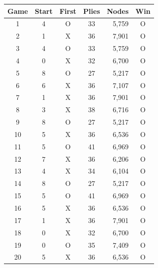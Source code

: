 \begin{tabular}{ccccrc}
\toprule
Game & Start & First & Plies & Nodes & Win \\
\midrule
1 & 4 & O & 33 & 5,759 & O \\
2 & 1 & X & 36 & 7,901 & O \\
3 & 4 & O & 33 & 5,759 & O \\
4 & 0 & X & 32 & 6,700 & O \\
5 & 8 & O & 27 & 5,217 & O \\
6 & 6 & X & 36 & 7,107 & O \\
7 & 1 & X & 36 & 7,901 & O \\
8 & 3 & X & 38 & 6,716 & O \\
9 & 8 & O & 27 & 5,217 & O \\
10 & 5 & X & 36 & 6,536 & O \\
11 & 5 & O & 41 & 6,969 & O \\
12 & 7 & X & 36 & 6,206 & O \\
13 & 4 & X & 34 & 6,104 & O \\
14 & 8 & O & 27 & 5,217 & O \\
15 & 5 & O & 41 & 6,969 & O \\
16 & 5 & X & 36 & 6,536 & O \\
17 & 1 & X & 36 & 7,901 & O \\
18 & 0 & X & 32 & 6,700 & O \\
19 & 0 & O & 35 & 7,409 & O \\
20 & 5 & X & 36 & 6,536 & O \\
\bottomrule
\end{tabular}
